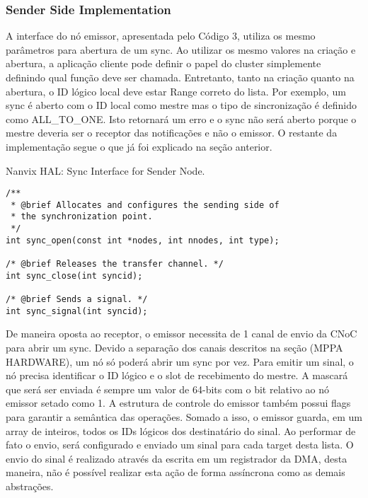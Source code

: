 			\subsubsection{Sender Side Implementation}

				A interface do nó emissor, apresentada pelo Código 3, utiliza os mesmo parâmetros para abertura de um sync.
				Ao utilizar os mesmo valores na criação e abertura, a aplicação cliente pode definir o papel do cluster simplemente definindo qual função deve ser chamada.
				Entretanto, tanto na criação quanto na abertura, o ID lógico local deve estar Range correto do lista.
				Por exemplo, um sync é aberto com o ID local como mestre mas o tipo de sincronização é definido como ALL\_TO\_ONE.
				Isto retornará um erro e o sync não será aberto porque o mestre deveria ser o receptor das notificações e não o emissor.
				O restante da implementação segue o que já foi explicado na seção anterior.

\begin{listing}[!tb]
\caption{Nanvix HAL: Sync Interface for Sender Node.}
\label{code:hal-sync-sender}
\begin{verbatim}
/**
 * @brief Allocates and configures the sending side of
 * the synchronization point.
 */
int sync_open(const int *nodes, int nnodes, int type);

/* @brief Releases the transfer channel. */
int sync_close(int syncid);

/* @brief Sends a signal. */
int sync_signal(int syncid);
\end{verbatim}
\end{listing}

				De maneira oposta ao receptor, o emissor necessita de 1 canal de envio da CNoC para abrir um sync.
				Devido a separação dos canais descritos na seção (MPPA HARDWARE), um nó só poderá abrir um sync por vez.
				Para emitir um sinal, o nó precisa identificar o ID lógico e o slot de recebimento do mestre.
				A mascará que será ser enviada é sempre um valor de 64-bits com o bit relativo ao nó emissor setado como 1.
				A estrutura de controle do emissor também possui flags para garantir a semântica das operações.
				Somado a isso, o emissor guarda, em um array de inteiros, todos os IDs lógicos dos destinatário do sinal.
				Ao performar de fato o envio, será configurado e enviado um sinal para cada target desta lista.
				O envio do sinal é realizado através da escrita em um registrador da DMA, desta maneira, não é possível realizar esta ação de forma assíncrona como as demais abstrações.

